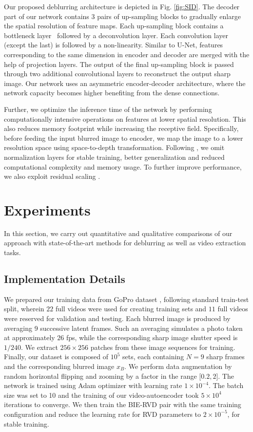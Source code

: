 \documentclass[10pt,twocolumn,letterpaper]{article}
\begin{document}
Our proposed deblurring architecture is depicted in Fig. \ref{fig:SID}. The decoder part of our network contains $3$ pairs of up-sampling blocks to gradually enlarge the spatial resolution of feature maps. Each up-sampling block contains a bottleneck layer~\cite{jegou2017one} followed by a deconvolution layer. Each convolution layer (except the last) is followed by a non-linearity. Similar to U-Net, features corresponding to the same dimension in encoder and decoder are merged with the help of projection layers. The output of the final up-sampling block is passed through two additional convolutional layers to reconstruct the output sharp image. Our network uses an asymmetric encoder-decoder architecture, where the network capacity becomes higher benefiting from the dense connections. 

Further, we optimize the inference time of the network by performing computationally intensive operations on features at lower spatial resolution. This also reduces memory footprint while increasing the receptive field. Specifically, before feeding the input blurred image to encoder, we map the image to a lower resolution space using space-to-depth transformation. Following \cite{lim2017enhanced,nah2017deep}, we omit normalization layers for stable training, better generalization and reduced computational complexity and memory usage. To further improve performance, we also exploit residual scaling \cite{lim2017enhanced}.

\section{Experiments}

In this section, we carry out quantitative and qualitative comparisons of our approach with state-of-the-art methods for deblurring as well as video extraction tasks.  

\subsection{Implementation Details} 
We prepared our training data from GoPro dataset \cite{nah2017deep}, following standard train-test split, wherein $22$ full videos were used for creating training sets and $11$ full videos were reserved for validation and testing. 
Each blurred image is produced by averaging 9 successive latent frames. Such an averaging simulates a photo taken at approximately $26$ fps, while the corresponding sharp image shutter speed is $1/240$. We extract $256\times256$ patches from these image sequences for training. 
Finally, our dataset is composed of $10^5$ sets, each containing $N=9$ sharp frames and the corresponding blurred image $x_B$.
We perform data augmentation by random horizontal flipping and zooming by a factor in the range [$0.2,2$].
The network is trained using Adam optimizer with learning rate $1 \times 10^{-4}$. The batch size was set to 10 and the training of our video-autoencoder took $5 \times 10^4$ iterations to converge. We then train the BIE-RVD pair with the same training configuration and reduce the learning rate for RVD parameters to $2 \times 10^{-5}$, for stable training.
\end{document}
